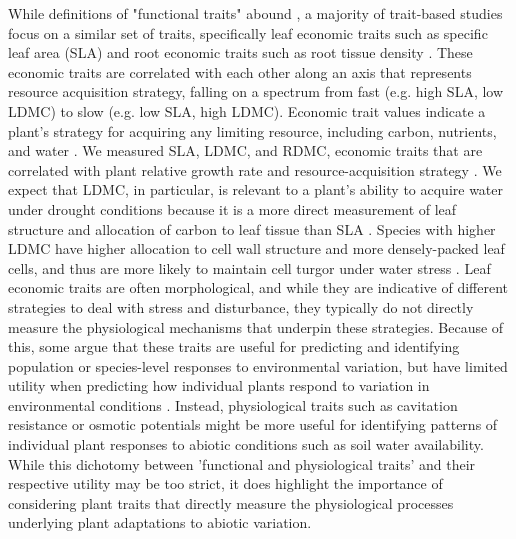 \documentclass[12pt, letterpaper]{article}
\begin{document}
While definitions of "functional traits" abound , a majority of trait-based studies focus on a similar set of traits, specifically leaf economic traits such as specific leaf area (SLA)  and root economic traits such as root tissue density \cite{Kramer-Walter2016}. These economic traits are correlated with each other along an axis that represents resource acquisition strategy, falling on a spectrum from fast (e.g. high SLA, low LDMC) to slow (e.g. low SLA, high LDMC). Economic trait values indicate a plant’s strategy for acquiring any limiting resource, including carbon, nutrients, and water \cite{Reich2014}. We measured SLA, LDMC, and RDMC, economic traits that are correlated with plant relative growth rate and resource-acquisition strategy \cite{Weiher1999ChallengingEcology}. We expect that LDMC, in particular, is relevant to a plant’s ability to acquire water under drought conditions because it is a more direct measurement of leaf structure and allocation of carbon to leaf tissue than SLA \cite{Niinemets1999ComponentsPlants, Hodgson2011}. Species with higher LDMC have higher allocation to cell wall structure and more densely-packed leaf cells, and thus are more likely to maintain cell turgor under water stress \cite{Niinemets2001Global-scaleShrubs, Poorter2009CausesMeta-analysis, Wilcox2020PlantPrairie}. Leaf economic traits are often morphological, and while they are indicative of different strategies to deal with stress and disturbance, they typically do not directly measure the physiological mechanisms that underpin these strategies. Because of this, some argue that these traits are useful for predicting and identifying population or species-level responses to environmental variation, but have limited utility when predicting how individual plants respond to variation in environmental conditions \cite{Volaire2018}. Instead, physiological traits such as cavitation resistance or osmotic potentials might be more useful for identifying patterns of individual plant responses to abiotic conditions such as soil water availability. While this dichotomy between ’functional and physiological traits’ and their respective utility may be too strict, it does highlight the importance of considering plant traits that directly measure the physiological processes underlying plant adaptations to abiotic variation.
\end{document}

